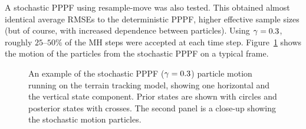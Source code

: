 \documentclass{article}
\begin{document}
A stochastic PPPF using resample-move was also tested. This obtained almost identical average RMSEs to the deterministic PPPF, higher effective sample sizes (but of course, with increased dependence between particles). Using $\gamma=0.3$, roughly $25$--$50\%$ of the MH steps were accepted at each time step. Figure~\ref{fig:drone_example_frame_stochastic} shows the motion of the particles from the stochastic PPPF on a typical frame.
%
\begin{figure}
\centering
{}
\caption{An example of the stochastic PPPF ($\gamma=0.3$) particle motion running on the terrain tracking model, showing one horizontal and the vertical state component. Prior states are shown with circles and posterior states with crosses. The second panel is a close-up showing the stochastic motion particles.}
\label{fig:drone_example_frame_stochastic}
\end{figure}
\end{document}
